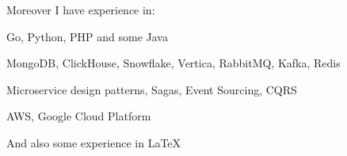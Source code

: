 Moreover I have experience in:
\begin{bulist}
  \item Go, Python, PHP and some Java
  \item MongoDB, ClickHouse, Snowflake, Vertica, RabbitMQ, Kafka, Redis
  \item Microservice design patterns, Sagas, Event Sourcing, CQRS
  \item AWS, Google Cloud Platform
\end{bulist}
And also some experience in \LaTeX

